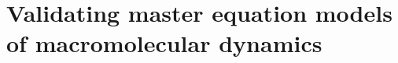 \chapter{Validating master equation models of macromolecular dynamics}
\label{chapter:validation-of-master-equation}



